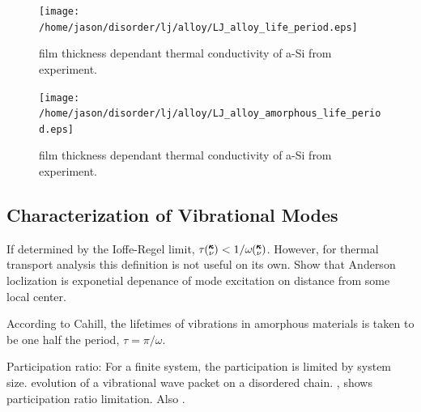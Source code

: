 \documentclass[aps,prb,preprint,superscriptaddress,amsmath,amssymb,floatfix]{revtex4}
\newcommand{\kv}{\mspace{-4.0mu}\left(\mspace{-8.0mu}
\begin{smallmatrix}&\pmb{\kappa} \\&\nu\end{smallmatrix}
\mspace{-3.0mu}\right)}
\begin{document}
\begin{figure}
\begin{center}
\texttt{[image: /home/jason/disorder/lj/alloy/LJ\_alloy\_life\_period.eps]}
\vspace*{-5mm}
\end{center}
\caption{\label{FIG:phonon_diff} film thickness dependant thermal 
conductivity of a-Si from experiment.}
\end{figure}

\begin{figure}
\begin{center}
\texttt{[image: /home/jason/disorder/lj/alloy/LJ\_alloy\_amorphous\_life\_period.eps]}
\vspace*{-5mm}
\end{center}
\caption{\label{FIG:phonon_diff} film thickness dependant thermal 
conductivity of a-Si from experiment.}
\end{figure}

\vspace*{100mm}

\subsection{\label{S:Lifetimes:}Characterization of Vibrational Modes}
If determined by the Ioffe-Regel limit, $\tau \kv < 1/\omega \kv$.
\cite{taraskin_determination_1999} However, for thermal transport 
analysis this definition is not useful on its own. Show that Anderson 
loclization is exponetial depenance of mode excitation on distance from 
some local center\cite{feldman_numerical_1999}.

According to Cahill, the lifetimes of vibrations in amorphous materials 
is taken to be one half the period, $\tau = \pi/\omega $.
\cite{cahill_heat_1989}

Participation ratio:
For a finite system, the participation is limited by system size.
evolution of a vibrational wave packet on a disordered chain.
\cite{allen_evolution_1998}, shows participation ratio limitation. Also 
\cite{garber_numerical_2001}.
\end{document}
